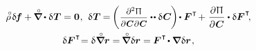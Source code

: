 \nopagebreak\begin{equation}
\label{variationsforcurrentconfiguration}
\begin{array}{c}
\mathcircabove{\rho} \hspace{.25ex} \variation{\hspace{-0.2ex}\massloadvector}
+ \hspace{-0.1ex} \boldnablacircled \hspace{-0.1ex} \dotp \variation{\hspace{.1ex}\firstpiolakirchhoffstress}
= \zerovector
\hspace{.1ex} , \:\,
%
\variation{\hspace{.1ex}\firstpiolakirchhoffstress} \hspace{-0.1ex}
= \hspace{-0.2ex} \left( \hspace{.1ex} \scalebox{.88}{$ \displaystyle\frac{\partial^2 \hspace{.1ex} \potentialenergydensity}{\raisemath{-0.1em}{\partial \hspace{.1ex} \bm{C} \hspace{.1ex} \partial \hspace{.1ex} \bm{C}}} $} \dotdotp \variation{\hspace{.1ex}\bm{C}} \hspace{-0.15ex} \right) \hspace{-0.3ex} \dotp \bm{F}^{\hspace{.1ex}\T} \hspace{-0.25ex}
+ \hspace{.1ex}
\displaystyle\frac{\partial \hspace{.1ex} \potentialenergydensity}{\raisemath{-0.1em}{\partial \hspace{.1ex} \bm{C}}} \dotp \variation{\bm{F}}^{\hspace{.1ex}\T}
\hspace{-0.4ex} ,
\\[1em]
%
\variation{\bm{F}}^{\hspace{.1ex}\T} \hspace{-0.5ex}
= \variation{\hspace{.1ex} \boldnablacircled \currentlocationvector}
= \hspace{-0.2ex} \boldnablacircled \hspace{.1ex} \variation{\currentlocationvector}
= \hspace{-0.1ex} \bm{F}^{\hspace{.1ex}\T} \hspace{-0.25ex} \dotp \boldnabla \hspace{.1ex} \variation{\currentlocationvector} \hspace{.15ex} ,

\end{array}
\end{equation}
